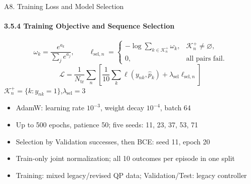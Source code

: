 \documentclass[t,10pt,handout]{beamer}
\newenvironment{slidebody}{\begin{minipage}[t][68.5mm][s]{\linewidth}\vspace{0pt}}{\par\vspace{0pt}\end{minipage}}
\begin{document}
\begin{frame}{A8. Training Loss and Model Selection}
  \hypertarget{appendix-a8}{}
  \framesubtitle{3.5.4 Training Objective and Sequence Selection}
  \begin{slidebody}
    \normalsize
    \[\omega_k=\frac{e^{a_k}}{\sum_j e^{a_j}},\qquad
      \ell_{\mathrm{sel},n}=\begin{cases}
        -\log\sum_{k\in\mathcal K_n^+}\omega_k, & \mathcal K_n^+\ne\varnothing, \\
        0,                                      & \text{all pairs fail}.
      \end{cases}\]
    \[\mathcal L=\frac1{N_{\mathrm{tr}}}\sum_n\left[\frac1{10}\sum_k
        \ell(y_{nk},\hat p_k)+\lambda_{\mathrm{sel}}\ell_{\mathrm{sel},n}\right]\]
    \vfill
    \centering $\mathcal K_n^+=\{k:y_{nk}=1\}$,\quad $\lambda_{\mathrm{sel}}=3$\par\vfill
    \begin{itemize}
      \item AdamW: learning rate $10^{-3}$, weight decay $10^{-4}$, batch 64
      \item Up to 500 epochs, patience 50; five seeds: 11, 23, 37, 53, 71
      \item Selection by Validation successes, then BCE: seed 11, epoch 20
      \item Train-only joint normalization; all 10 outcomes per episode in one split
      \item Training: mixed legacy/revised QP data; Validation/Test: legacy controller
    \end{itemize}

    \vfill
  \end{slidebody}
\end{frame}
\end{document}
